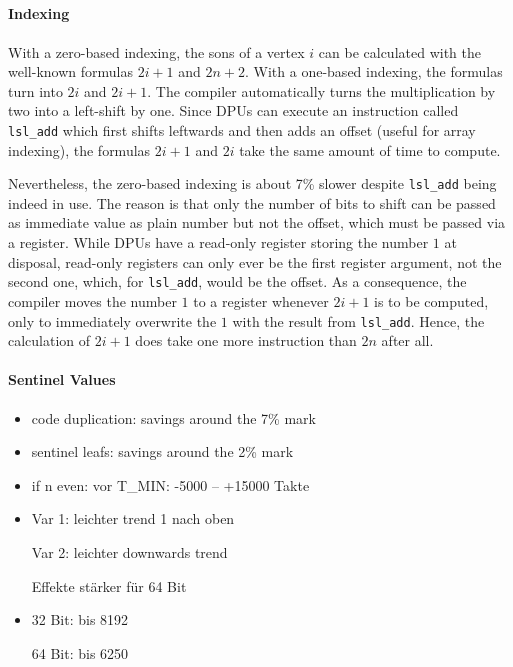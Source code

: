 \subsection{\texorpdfstring{\HS{}}{HeapSort}}
\label{subsec:tasklet:heap}


\paragraph{Indexing}
With a zero-based indexing, the sons of a vertex \(i\) can be calculated with the well-known formulas \(2i + 1\) and \(2n + 2\).
With a one-based indexing, the formulas turn into \(2i\) and \(2i + 1\).
The compiler automatically turns the multiplication by two into a left-shift by one.
Since DPUs can execute an instruction called \texttt{lsl\_add} which first shifts leftwards and then adds an offset (useful \eg{} for array indexing), the formulas \(2i + 1\) and \(2i\) take the same amount of time to compute.

Nevertheless, the zero-based indexing is about 7\% slower despite \texttt{lsl\_add} being indeed in use.
The reason is that only the number of bits to shift can be passed as immediate value as plain number but not the offset, which must be passed via a register.
While DPUs have a read-only register storing the number \(1\) at disposal, read-only registers can only ever be the first register argument, not the second one, which, for \texttt{lsl\_add}, would be the offset.
As a consequence, the compiler moves the number \(1\) to a register whenever \(2i + 1\) is to be computed, only to immediately overwrite the \(1\) with the result from \texttt{lsl\_add}.
Hence, the calculation of \(2i + 1\) does take one more instruction than \(2n\) after all.

\paragraph{Sentinel Values}


\begin{itemize}
	\item
	code duplication:
	savings around the 7\% mark

	\item
	sentinel leafs:
	savings around the 2\% mark

	\item
	if n even: vor T\_MIN: -5000 -- +15000 Takte

	\item
	Var 1:
	leichter trend 1 nach oben

	Var 2:
	leichter downwards trend

	Effekte stärker für 64 Bit

	\item
	32 Bit: bis 8192

	64 Bit: bis 6250
\end{itemize}

